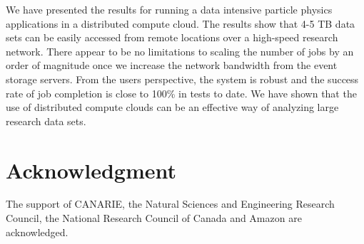 \documentclass[10pt, conference, compsocconf]{IEEEtran}
\begin{document}
We have presented the results for running a data intensive
particle physics applications in a distributed compute cloud.
The results show that 4-5 TB data sets can be easily accessed
from remote locations over a high-speed research network.
There appear to be no limitations to scaling the number of jobs
by an order of magnitude once we increase the network bandwidth
from the event storage servers.
From the users perspective, the system is robust and the success rate
of job completion is close to 100\% in tests to date.
We have shown that the use of distributed compute clouds can be an effective way of 
analyzing large research data sets.

\section*{Acknowledgment}
The support of CANARIE, the Natural Sciences and Engineering Research Council,
the National Research Council of Canada and Amazon are acknowledged.
\end{document}
